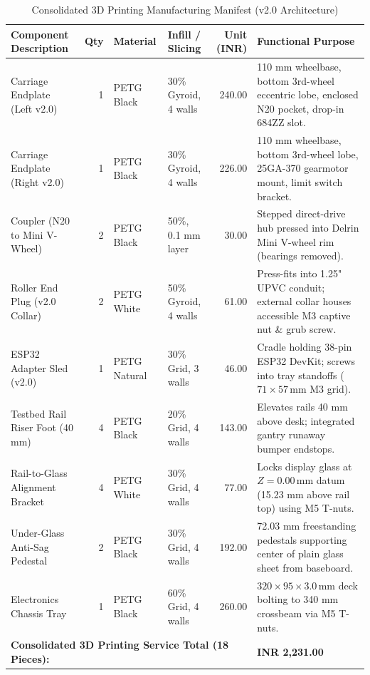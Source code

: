 \documentclass[10pt,a4paper]{article}
\begin{document}
\begin{table}[H]
\centering
\small
\begin{tabularx}{\textwidth}{p{4.8cm} r l l r X}
\toprule
\textbf{Component Description} & \textbf{Qty} & \textbf{Material} & \textbf{Infill / Slicing} & \textbf{Unit (INR)} & \textbf{Functional Purpose} \\
\midrule
Carriage Endplate (Left v2.0) & 1 & PETG Black & 30\% Gyroid, 4 walls & 240.00 & 110 mm wheelbase, bottom 3rd-wheel eccentric lobe, enclosed N20 pocket, drop-in 684ZZ slot. \\
Carriage Endplate (Right v2.0) & 1 & PETG Black & 30\% Gyroid, 4 walls & 226.00 & 110 mm wheelbase, bottom 3rd-wheel lobe, 25GA-370 gearmotor mount, limit switch bracket. \\
Coupler (N20 to Mini V-Wheel) & 2 & PETG Black & 50\%, 0.1 mm layer & 30.00 & Stepped direct-drive hub pressed into Delrin Mini V-wheel rim (bearings removed). \\
Roller End Plug (v2.0 Collar) & 2 & PETG White & 50\% Gyroid, 4 walls & 61.00 & Press-fits into 1.25" UPVC conduit; external collar houses accessible M3 captive nut \& grub screw. \\
ESP32 Adapter Sled (v2.0) & 1 & PETG Natural & 30\% Grid, 3 walls & 46.00 & Cradle holding 38-pin ESP32 DevKit; screws into tray standoffs ($71 \times 57\,\text{mm}$ M3 grid). \\
Testbed Rail Riser Foot (40 mm) & 4 & PETG Black & 20\% Grid, 4 walls & 143.00 & Elevates rails 40 mm above desk; integrated gantry runaway bumper endstops. \\
Rail-to-Glass Alignment Bracket & 4 & PETG White & 30\% Grid, 4 walls & 77.00 & Locks display glass at $Z = 0.00\,\text{mm}$ datum (15.23 mm above rail top) using M5 T-nuts. \\
Under-Glass Anti-Sag Pedestal & 2 & PETG Black & 30\% Grid, 4 walls & 192.00 & 72.03 mm freestanding pedestals supporting center of plain glass sheet from baseboard. \\
Electronics Chassis Tray & 1 & PETG Black & 60\% Grid, 4 walls & 260.00 & $320 \times 95 \times 3.0\,\text{mm}$ deck bolting to 340 mm crossbeam via M5 T-nuts. \\
\midrule
\multicolumn{5}{l}{\textbf{Consolidated 3D Printing Service Total (18 Pieces):}} & \textbf{INR 2,231.00} \\
\bottomrule
\end{tabularx}
\caption{Consolidated 3D Printing Manufacturing Manifest (v2.0 Architecture)}
\label{tab:3dprint_manifest}
\end{table}
\end{document}
